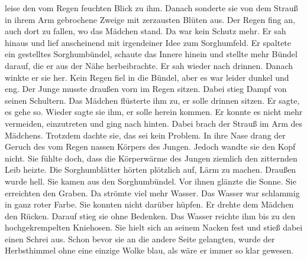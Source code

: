 \documentclass[prd,12pt,tightenlines,notitlepage,nofootinbib]{revtex4-1}
\begin{document}
leise den vom Regen feuchten Blick zu ihm.  Danach sonderte sie von dem
Strauß in ihrem Arm gebrochene Zweige mit zerzausten Blüten aus.
Der Regen fing an, auch dort zu fallen, wo das Mädchen stand.  Da war kein Schutz
mehr.  Er sah hinaus und lief anscheinend mit irgendeiner Idee zum
Sorghumfeld.  Er spaltete ein gestelltes Sorghumbündel,
schaute das Innere hinein und stellte mehr
Bündel darauf, die er aus der Nähe herbeibrachte.  Er sah wieder nach drinnen.
Danach winkte er sie her.  Kein Regen fiel in die Bündel, aber es war
leider dunkel und eng.  Der Junge musste draußen vorn im Regen
sitzen.  Dabei stieg Dampf von seinen Schultern.  Das Mädchen
flüsterte ihm zu, er solle drinnen sitzen.  Er sagte, es gehe so.  Wieder
sagte sie ihm, er solle herein kommen.  Er konnte es nicht mehr vermeiden,
einzutreten und ging nach hinten.
Dabei brach der Strauß im Arm des
Mädchens.  Trotzdem dachte sie, das sei kein Problem.  In ihre Nase drang
der Geruch des vom Regen nassen Körpers des Jungen.  Jedoch wandte
sie den Kopf nicht.  Sie fühlte doch, dass die Körperwärme des Jungen
ziemlich den zitternden Leib heizte.  Die Sorghumblätter hörten
plötzlich auf, Lärm zu machen.  Draußen wurde hell.  Sie kamen aus
den Sorghumbündel.  Vor ihnen glänzte die Sonne.  Sie
erreichten den Graben.  Da strömte viel mehr Wasser.  Das Wasser war
schlammig in ganz roter Farbe.  Sie konnten nicht darüber hüpfen.  Er
drehte dem Mädchen den Rücken.  Darauf stieg sie ohne Bedenken.  Das
Wasser reichte ihm bis zu den hochgekrempelten Kniehosen.  Sie hielt
sich an seinem Nacken fest und stieß dabei einen Schrei aus.  Schon
bevor sie an die andere Seite gelangten, wurde der Herbsthimmel ohne
eine einzige Wolke blau, als wäre er immer so klar gewesen.
\end{document}
